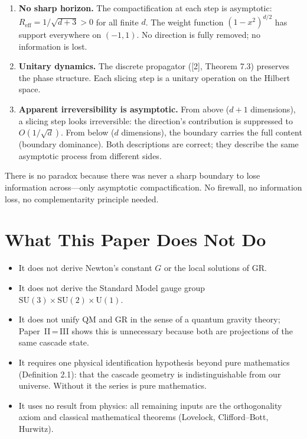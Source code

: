 \documentclass[12pt,a4paper]{article}
\begin{document}
\begin{enumerate}
\item \textbf{No sharp horizon.} The compactification at each step is asymptotic: $R_{\text{eff}} = 1/\sqrt{d + 3} >
0$ for all finite $d$. The weight function $(1 - x^2)^{d/2}$ has support everywhere on $(-1, 1)$.
No direction is fully removed; no information is lost.
\item \textbf{Unitary dynamics.} The discrete propagator ([2], Theorem 7.3) preserves the phase
structure. Each slicing step is a unitary operation on the Hilbert space.
\item \textbf{Apparent irreversibility is asymptotic.} From above ($d + 1$ dimensions), a slicing step
looks irreversible: the direction's contribution is suppressed to $O(1/\sqrt{d})$. From below
($d$ dimensions), the boundary carries the full content (boundary dominance). Both
descriptions are correct; they describe the same asymptotic process from different
sides.
\end{enumerate}

There is no paradox because there was never a sharp boundary to lose information
across---only asymptotic compactification. No firewall, no information loss, no complementarity principle needed.

\section{What This Paper Does Not Do}\label{sec:what-this-paper-does-not-do}

\begin{itemize}
\item It does not derive Newton's constant $G$ or the local solutions of GR.
\item It does not derive the Standard Model gauge group $\text{SU}(3) \times \text{SU}(2) \times \text{U}(1)$.
\item It does not unify QM and GR in the sense of a quantum gravity theory;
Paper~II\,=\,III shows this is unnecessary because both are projections of the
same cascade state.
\item It requires one physical identification hypothesis beyond pure mathematics (Definition 2.1): that the cascade geometry is indistinguishable from our universe. Without
it the series is pure mathematics.
\item It uses no result from physics: all remaining inputs are the orthogonality axiom and
classical mathematical theorems (Lovelock, Clifford--Bott, Hurwitz).
\end{itemize}
\end{document}
